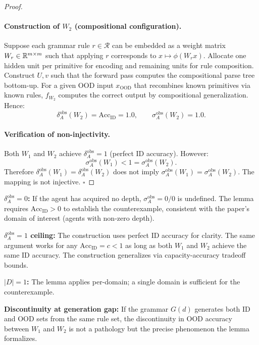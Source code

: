 \begin{proof}
\paragraph{Construction of $W_2$ (compositional configuration).}
Suppose each grammar rule $r \in \mathcal{R}$ can be embedded as a
weight matrix $W_r \in \mathbb{R}^{m \times m}$ such that applying $r$
corresponds to $x \mapsto \phi(W_r x)$. Allocate one hidden unit
per primitive for encoding and remaining units for rule composition.
Construct $U, v$ such that the forward pass computes the compositional
parse tree bottom-up. For a given OOD input $x_{\text{OOD}}$ that
recombines known primitives via known rules, $f_{W_2}$ computes
the correct output by compositional generalization. Hence:
\[
\delta_A^{\text{obs}}(W_2) = \text{Acc}_{\text{ID}} = 1.0, \qquad
\sigma_A^{\text{obs}}(W_2) = 1.0.
\]

\paragraph{Verification of non-injectivity.}
Both $W_1$ and $W_2$ achieve $\delta_A^{\text{obs}} = 1$ (perfect ID
accuracy). However:
\[
\sigma_A^{\text{obs}}(W_1) < 1 = \sigma_A^{\text{obs}}(W_2).
\]
Therefore $\delta_A^{\text{obs}}(W_1) = \delta_A^{\text{obs}}(W_2)$
does not imply $\sigma_A^{\text{obs}}(W_1) = \sigma_A^{\text{obs}}(W_2)$.
The mapping is not injective. $\square$
\end{proof}

\begin{boundary-case}
\textbf{$\delta_A^{\text{obs}} = 0$:} If the agent has acquired no depth,
$\sigma_A^{\text{obs}} = 0/0$ is undefined. The lemma requires
$\text{Acc}_{\text{ID}} > 0$ to establish the counterexample, consistent
with the paper's domain of interest (agents with non-zero depth).

\textbf{$\delta_A^{\text{obs}} = 1$ ceiling:} The construction uses
perfect ID accuracy for clarity. The same argument works for any
$\text{Acc}_{\text{ID}} = c < 1$ as long as both $W_1$ and $W_2$ achieve
the same ID accuracy. The construction generalizes via capacity-accuracy
tradeoff bounds.

\textbf{$|D| = 1$:} The lemma applies per-domain; a single domain is
sufficient for the counterexample.

\textbf{Discontinuity at generation gap:} If the grammar $G(d)$ generates
both ID and OOD sets from the same rule set, the discontinuity in OOD
accuracy between $W_1$ and $W_2$ is not a pathology but the precise
phenomenon the lemma formalizes.
\end{boundary-case}

